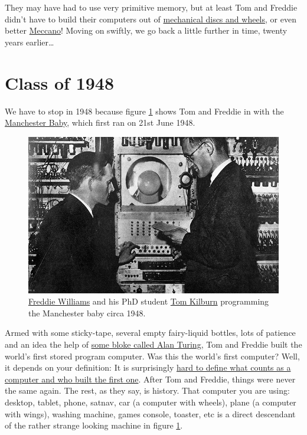 \documentclass[
  12pt,
]{book}
\begin{document}
They may have had to use very primitive memory, but at least Tom and Freddie didn't have to build their computers out of \href{https://www.sciencemuseum.org.uk/objects-and-stories/lovelace-turing-and-invention-computers}{mechanical discs and wheels}, or even better \href{https://en.wikipedia.org/wiki/Differential_analyser\#Use_of_Meccano}{Meccano}! Moving on swiftly, we go back a little further in time, twenty years earlier\ldots{}

\hypertarget{y1948}{%
\section{Class of 1948}\label{y1948}}

We have to stop in 1948 because figure \ref{fig:tomfred-fig} shows Tom and Freddie in with the \href{https://en.wikipedia.org/wiki/Manchester_Baby}{Manchester Baby}, which first ran on 21st June 1948.

\begin{figure}

{\centering \includegraphics[width=0.99\linewidth]{images/kilburn_williams_manchester_baby} 

}

\caption{\href{https://en.wikipedia.org/wiki/Frederic_Calland_Williams}{Freddie Williams} and his PhD student \href{https://en.wikipedia.org/wiki/Tom_Kilburn}{Tom Kilburn} programming the Manchester baby circa 1948.}\label{fig:tomfred-fig}
\end{figure}



Armed with some sticky-tape, several empty fairy-liquid bottles, lots of patience and an idea the help of \href{https://en.wikipedia.org/wiki/Alan_Turing}{some bloke called Alan Turing}, Tom and Freddie built the world's first stored program computer. Was this the world's first computer? Well, it depends on your definition: It is surprisingly \href{https://web.archive.org/web/20040606201305/http://www.dai.ed.ac.uk/homes/cam/fcomp.shtml}{hard to define what counts as a computer and who built the first one}. After Tom and Freddie, things were never the same again. The rest, as they say, is history. That computer you are using: desktop, tablet, phone, satnav, car (a computer with wheels), plane (a computer with wings), washing machine, games console, toaster, etc is a direct descendant of the rather strange looking machine in figure \ref{fig:tomfred-fig}.
\end{document}
